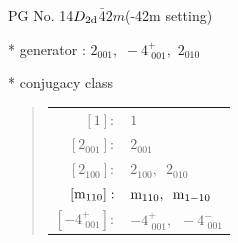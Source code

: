 \documentclass[fleqn,8pt]{jsarticle}
\begin{document}
\setcounter{MaxMatrixCols}{32}

\renewcommand{\tablename}{Table~}
\renewcommand{\figurename}{Figure~}
\begin{center}
\LARGE
PG No. 14\quad$D_{\rm 2d}$\quad$\bar{4}2m$\quad(-42m setting)\quad[ tetragonal ]
\end{center}

* generator : $2{}_{001},\,\,-4^{+}_{\,\,001},\,\,2{}_{010}$

* conjugacy class
\begin{quote}
\begin{tabular}{rl}
$ [1]: $ & $ 1 $ \\
$ [2{}_{001}]: $ & $ 2{}_{001} $ \\
$ [2{}_{100}]: $ & $ 2{}_{100},\,\,\,2{}_{010} $ \\
$ [{\rm m}_{110}]: $ & $ {\rm m}_{110},\,\,\,{\rm m}_{1-10} $ \\
$ [-4^{+}_{\,\,001}]: $ & $ -4^{+}_{\,\,001},\,\,\,-4^{-}_{\,\,001} $
\end{tabular}
\end{quote}
\end{document}
